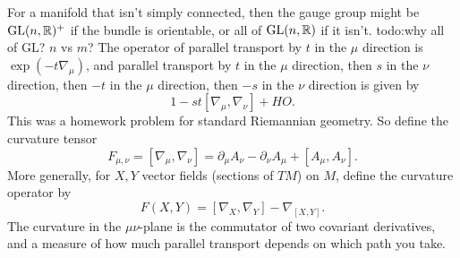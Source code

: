 For a manifold that isn't simply connected, then the gauge group might be $\mathrm{GL}(n,\mathbb{R})^+$ if the bundle is orientable, or all of $\mathrm{GL}(n,\mathbb{R})$ if it isn't. {\color{red}todo:why all of $\mathrm{GL}$? $n$ vs $m$?} The operator of parallel transport by $t$ in the $\mu$ direction is $\exp(-t \nabla_{\mu})$, and parallel transport by $t$ in the $\mu$ direction, then $s$ in the $\nu$ direction, then $-t$ in the $\mu$ direction, then $-s$ in the $\nu$ direction is given by \[
    1- st [\nabla_{\mu},\nabla_{\nu}]+HO.
\] This was a homework problem for standard Riemannian geometry. So define the curvature tensor 
\begin{equation}\label{curv} 
F_{\mu,\nu}= [\nabla_{\mu},\nabla_{\nu}]=\partial _{\mu}A_{\nu}-\partial _{\nu}A_{\mu}+[A_{\mu},A_{\nu}].
\end{equation}
More generally, for $X,Y$ vector fields (sections of $TM$) on $M$, define the curvature operator by \[
F(X,Y)=[\nabla_X,\nabla_Y]-\nabla_{[X,Y]}.
\] The curvature in the $\mu\nu$-plane is the commutator of two covariant derivatives, and a measure of how much parallel transport depends on which path you take.

